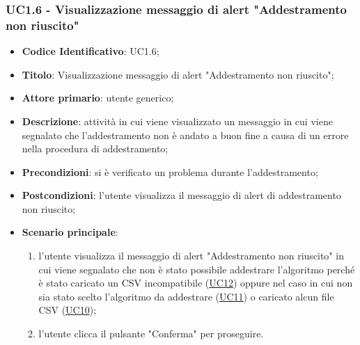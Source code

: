 	\subsubsection{UC1.6 - Visualizzazione messaggio di alert "Addestramento non riuscito"}
		\begin{itemize}
			\item\textbf{Codice Identificativo}: UC1.6;
			\item\textbf{Titolo}: Visualizzazione messaggio di alert "Addestramento non riuscito";
			\item\textbf{Attore primario}: utente generico;
			\item\textbf{Descrizione}: attività in cui viene visualizzato un messaggio in cui viene segnalato che l'addestramento non è andato a buon fine a causa di un errore nella procedura di addestramento;
			\item\textbf{Precondizioni}: si è verificato un problema durante l'addestramento;
			\item\textbf{Postcondizioni}: l'utente visualizza il messaggio di alert di addestramento non riuscito;					
			\item\textbf{Scenario principale}:
				\begin{enumerate}
				\item l'utente visualizza il messaggio di alert "Addestramento non riuscito" in cui viene segnalato che non è stato possibile addestrare l'algoritmo perché è stato caricato un CSV incompatibile (\hyperref[par:UC12]{UC12}) oppure nel caso in cui non sia stato scelto l'algoritmo da addestrare (\hyperref[par:UC11]{UC11}) o caricato alcun file CSV (\hyperref[par:UC10]{UC10});
				\item l'utente clicca il pulsante "Conferma" per proseguire.
					
				\end{enumerate}
				
					
				
					
		\end{itemize}

	\label{par:UC1.7}
